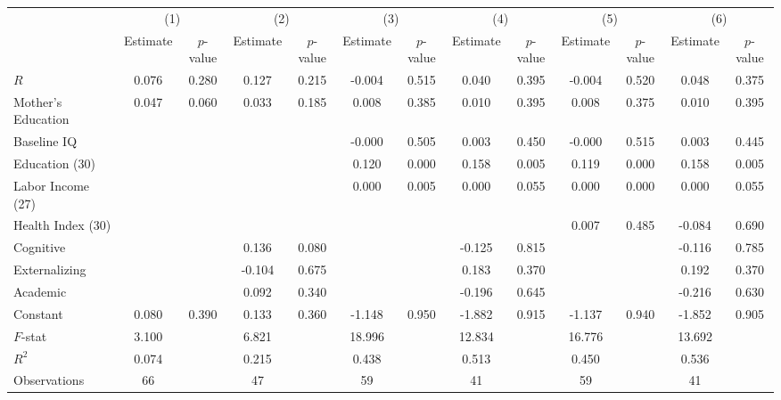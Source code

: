 \begin{tabular}{lcccccccccccc} \toprule
 & \multicolumn{2}{c}{(1)}  &  \multicolumn{2}{c}{(2)}  &  \multicolumn{2}{c}{(3)}  &  \multicolumn{2}{c}{(4)}  & \multicolumn{2}{c}{(5)} & \multicolumn{2}{c}{(6)} \\  
 & Estimate & $p$-value & Estimate & $p$-value & Estimate & $p$-value & Estimate & $p$-value & Estimate & $p$-value & Estimate & $p$-value \\ \midrule
$R$ &     0.076 &     0.280 &     0.127 &     0.215 &    -0.004 &     0.515 &     0.040 &     0.395 &    -0.004 &     0.520 &     0.048 &     0.375 \\  
Mother's Education &     0.047 &     0.060 &     0.033 &     0.185 &     0.008 &     0.385 &     0.010 &     0.395 &     0.008 &     0.375 &     0.010 &     0.395 \\  
Baseline IQ &          &          &         &         &    -0.000 &     0.505 &     0.003 &     0.450 &    -0.000 &     0.515 &     0.003 &     0.445 \\  
Education (30) &          &          &         &         &     0.120 &     0.000 &     0.158 &     0.005 &     0.119 &     0.000 &     0.158 &     0.005 \\  
Labor Income (27) &          &          &         &         &     0.000 &     0.005 &     0.000 &     0.055 &     0.000 &     0.000 &     0.000 &     0.055 \\  
Health Index (30) &          &         &         &         &         &         &         &         &     0.007 &     0.485 &    -0.084 &     0.690 \\  
Cognitive &          &          &     0.136 &     0.080 &         &         &    -0.125 &     0.815 &         &          &    -0.116 &     0.785 \\  
Externalizing &          &         &    -0.104 &     0.675 &         &         &     0.183 &     0.370 &          &         &     0.192 &     0.370 \\  
Academic &          &         &     0.092 &     0.340 &         &         &    -0.196 &     0.645 &          &          &    -0.216 &     0.630 \\  
Constant &     0.080 &     0.390 &     0.133 &     0.360 &    -1.148 &     0.950 &    -1.882 &     0.915 &    -1.137 &     0.940 &    -1.852 &     0.905 \\  \midrule
$F$-stat &     3.100 &          &     6.821 &         &    18.996 &         &    12.834 &         &    16.776 &          &    13.692 &         \\  
$R^2$ &     0.074 &          &     0.215 &         &     0.438 &         &     0.513 &         &     0.450 &         &     0.536 &         \\  
Observations &    66 &         &    47 &         &    59&         &    41 &         &    59&         &    41 &         \\  
\bottomrule \end{tabular}

